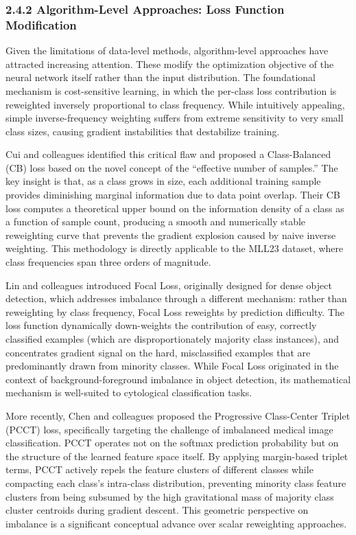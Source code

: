 \documentclass[11pt]{article}
\begin{document}
\subsubsection*{2.4.2 Algorithm-Level Approaches: Loss Function Modification}

Given the limitations of data-level methods, algorithm-level approaches have attracted increasing attention. These modify the optimization objective of the neural network itself rather than the input distribution. The foundational mechanism is cost-sensitive learning, in which the per-class loss contribution is reweighted inversely proportional to class frequency. While intuitively appealing, simple inverse-frequency weighting suffers from extreme sensitivity to very small class sizes, causing gradient instabilities that destabilize training.

Cui and colleagues \cite{cui2019} identified this critical flaw and proposed a Class-Balanced (CB) loss based on the novel concept of the ``effective number of samples.'' The key insight is that, as a class grows in size, each additional training sample provides diminishing marginal information due to data point overlap. Their CB loss computes a theoretical upper bound on the information density of a class as a function of sample count, producing a smooth and numerically stable reweighting curve that prevents the gradient explosion caused by naive inverse weighting. This methodology is directly applicable to the MLL23 dataset, where class frequencies span three orders of magnitude.

Lin and colleagues \cite{lin2017} introduced Focal Loss, originally designed for dense object detection, which addresses imbalance through a different mechanism: rather than reweighting by class frequency, Focal Loss reweights by prediction difficulty. The loss function dynamically down-weights the contribution of easy, correctly classified examples (which are disproportionately majority class instances), and concentrates gradient signal on the hard, misclassified examples that are predominantly drawn from minority classes. While Focal Loss originated in the context of background-foreground imbalance in object detection, its mathematical mechanism is well-suited to cytological classification tasks.

More recently, Chen and colleagues \cite{chen2023} proposed the Progressive Class-Center Triplet (PCCT) loss, specifically targeting the challenge of imbalanced medical image classification. PCCT operates not on the softmax prediction probability but on the structure of the learned feature space itself. By applying margin-based triplet terms, PCCT actively repels the feature clusters of different classes while compacting each class's intra-class distribution, preventing minority class feature clusters from being subsumed by the high gravitational mass of majority class cluster centroids during gradient descent. This geometric perspective on imbalance is a significant conceptual advance over scalar reweighting approaches.
\end{document}
